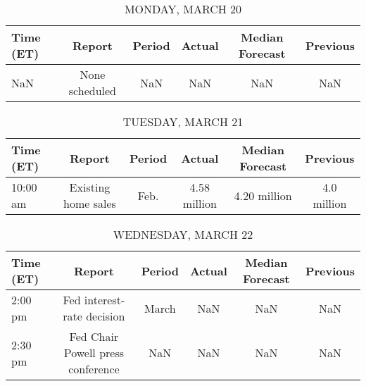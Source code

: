 \documentclass{article}%
\begin{document}
%
\normalsize%


\begin{table}[htbp]%
\caption{MONDAY, MARCH 20}%
\centering%
\begin{adjustbox}{width=1\textwidth}%
\begin{tabular}{lccccc}
\toprule
Time (ET) &         Report & Period & Actual & Median Forecast & Previous \\
\midrule
      NaN & None scheduled &    NaN &    NaN &             NaN &      NaN \\
\bottomrule
\end{tabular}
%
\end{adjustbox}%
\end{table}

%


\begin{table}[htbp]%
\caption{TUESDAY, MARCH 21}%
\centering%
\begin{adjustbox}{width=1\textwidth}%
\begin{tabular}{lccccc}
\toprule
Time (ET) &              Report & Period &       Actual & Median Forecast &    Previous \\
\midrule
 10:00 am & Existing home sales &   Feb. & 4.58 million &    4.20 million & 4.0 million \\
\bottomrule
\end{tabular}
%
\end{adjustbox}%
\end{table}

%


\begin{table}[htbp]%
\caption{WEDNESDAY, MARCH 22}%
\centering%
\begin{adjustbox}{width=1\textwidth}%
\begin{tabular}{lccccc}
\toprule
Time (ET) &                            Report & Period & Actual & Median Forecast & Previous \\
\midrule
  2:00 pm &        Fed interest-rate decision &  March &    NaN &             NaN &      NaN \\
  2:30 pm & Fed Chair Powell press conference &    NaN &    NaN &             NaN &      NaN \\
\bottomrule
\end{tabular}
%
\end{adjustbox}%
\end{table}

%
\end{document}
